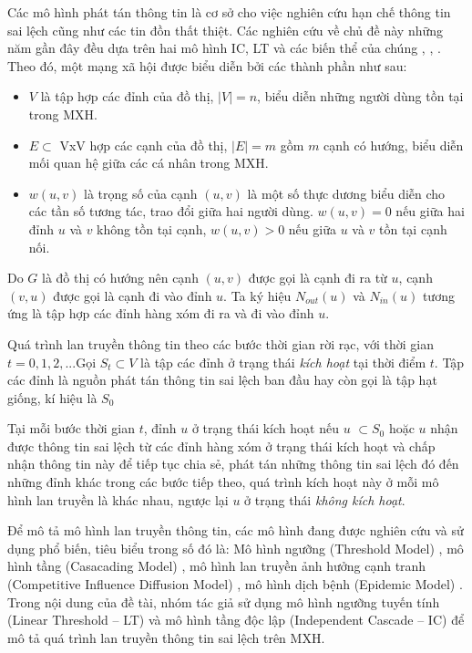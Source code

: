 Các mô hình phát tán thông tin là cơ sở cho việc nghiên cứu hạn chế thông tin sai lệch cũng như các tin đồn thất thiệt. Các nghiên cứu về chủ đề này những năm gần đây đều dựa trên hai mô hình IC, LT và các biến thể của chúng \cite{kemple2}, \cite{Golden}, \cite{Carnes}. Theo đó, một mạng xã hội được biểu diễn bởi các thành phần như sau:
\begin {itemize}
	\item $V$ là tập hợp các đỉnh của đồ thị, $|V| = n$, biểu diễn những người dùng tồn tại trong MXH.

	\item $E \subset$ VxV hợp các cạnh của đồ thị, $|E| = m$ gồm $m$ cạnh có hướng, biểu diễn mối quan hệ giữa các cá nhân trong MXH.

	\item $w(u,v)$ là trọng số của cạnh $(u, v)$ là một số thực dương biểu diễn cho các tần số tương tác, trao đổi giữa hai người dùng. $w(u, v) = 0$ nếu giữa hai đỉnh $u$ và $v$ không tồn tại cạnh, $w(u, v) > 0$ nếu giữa $u$ và $v$ tồn tại cạnh nối.	
\end {itemize}

Do $G$ là đồ thị có hướng nên cạnh $(u,v)$ được gọi là cạnh đi ra từ $u$, cạnh $(v,u)$ được gọi là cạnh đi vào đỉnh $u$. Ta ký hiệu $N_{out}(u)$ và $N_{in}(u)$ tương ứng là tập hợp các đỉnh hàng xóm đi ra và đi vào đỉnh $u$.

Quá trình lan truyền thông tin theo các bước thời gian rời rạc, với thời gian $t = 0, 1, 2, ... $Gọi $S_{t}\subset V$ là tập các đỉnh ở trạng thái {\itshape kích hoạt} tại thời điểm $t$. Tập các đỉnh là nguồn phát tán thông tin sai lệch ban đầu hay còn gọi là tập hạt giống, kí hiệu là $S_{0}$

Tại mỗi bước thời gian $t$, đỉnh $u$ ở trạng thái kích hoạt nếu $u$ $\subset S_{0}$ hoặc $u$ nhận được thông tin sai lệch từ các đỉnh hàng xóm ở trạng thái kích hoạt và chấp nhận thông tin này để tiếp tục chia sẻ, phát tán những thông tin sai lệch đó đến những đỉnh khác trong các bước tiếp theo, quá trình kích hoạt này ở mỗi mô hình lan truyền là khác nhau, ngược lại $u$ ở trạng thái {\itshape không kích hoạt}.

Để mô tả mô hình lan truyền thông tin, các mô hình đang được nghiên cứu và sử dụng phổ biến, tiêu biểu trong số đó là: Mô hình ngưỡng (Threshold Model) \cite{kemple2}, mô hình tầng (Casacading Model) \cite{Golden}, mô hình lan truyền ảnh hưởng cạnh tranh (Competitive Influence Diffusion Model) \cite{Carnes}, mô hình dịch bệnh (Epidemic Model) \cite{leskovec}. Trong nội dung của đề tài, nhóm tác giả sử dụng mô hình ngưỡng tuyến tính (Linear Threshold – LT) và mô hình tầng độc lập (Independent Cascade – IC) \cite{kemple1} để mô tả quá trình lan truyền thông tin sai lệch trên MXH.

